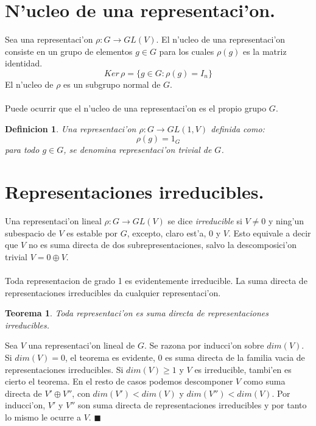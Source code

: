 \documentclass[a4paper,openright,12pt]{report}
\numberwithin{equation}{section} %
\newtheorem{teorema}{Teorema}[section] %
\newtheorem{definicion}{Definicion}[section] %
\newenvironment{proof}{\noindent{\it Demostracion:}}{\hfill$\blacksquare$} %
\begin{document}
\section{N'ucleo de una representaci'on.}
Sea una representaci'on $\rho : G \rightarrow GL(V)$. El n'ucleo de una representaci'on consiste en un grupo de elementos $g \in G$ 
para los cuales $\rho (g)$ es la matriz identidad.
\[
Ker \, \rho = \{ g \in G:\rho (g) = I_{n} \}
\]
El n'ucleo de $\rho$ es un subgrupo normal de $G$.\\
\\
Puede ocurrir que el n'ucleo de una representaci'on es el propio grupo $G$.
\begin{definicion}
Una representaci'on $\rho : G \rightarrow GL(1,V)$ definida como:
\[
\rho (g) = 1_{G}
\]
para todo $g \in G$, se denomina \textit{representaci'on trivial} de $G$.
\end{definicion} 
\section{Representaciones irreducibles.}
Una representaci'on lineal $\rho : G \rightarrow GL(V)$ se dice \textit{irreducible} si $V \neq 0$ y ning'un subespacio de $V$ es estable por $G$, excepto, claro est'a, 0 y $V$. Esto equivale a decir que $V$ no es suma directa de dos subrepresentaciones, salvo la descomposici'on trivial $V=0\oplus V$.\\
\\
Toda representacion de grado 1 es evidentemente irreducible. La suma directa de representaciones irreducibles da cualquier representaci'on.
\begin{teorema}
Toda representaci'on es suma directa de representaciones irreducibles.
\end{teorema} 
\begin{proof}
Sea $V$ una representaci'on lineal de $G$. Se razona por inducci'on sobre $dim(V)$. Si $dim(V)=0$, el teorema es evidente, 0 es suma directa de la familia vacia de representaciones irreducibles. Si $dim(V)\geq 1$ y $V$ es irreducible, tambi'en es cierto el teorema. En el resto de casos podemos descomponer $V$ como suma directa de $V' \oplus V''$, con $dim(V')< dim(V)$ y $dim(V'')< dim(V)$. Por inducci'on, $V'$ y $V''$ son suma directa de representaciones irreducibles y por tanto lo mismo le ocurre a $V$.
\end{proof}
\end{document}
